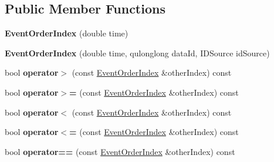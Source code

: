 \subsection*{Public Member Functions}
\begin{DoxyCompactItemize}
\item 
\hypertarget{class_picto_1_1_event_order_index_a6fedef2375e03834e3ae12951a050a47}{{\bfseries Event\-Order\-Index} (double time)}\label{class_picto_1_1_event_order_index_a6fedef2375e03834e3ae12951a050a47}

\item 
\hypertarget{class_picto_1_1_event_order_index_aa416ccc77d4453beff9ee55adcb070e3}{{\bfseries Event\-Order\-Index} (double time, qulonglong data\-Id, I\-D\-Source id\-Source)}\label{class_picto_1_1_event_order_index_aa416ccc77d4453beff9ee55adcb070e3}

\item 
\hypertarget{class_picto_1_1_event_order_index_ade1fd9fcac2a2fee91d082618a99c431}{bool {\bfseries operator$>$} (const \hyperlink{class_picto_1_1_event_order_index}{Event\-Order\-Index} \&other\-Index) const }\label{class_picto_1_1_event_order_index_ade1fd9fcac2a2fee91d082618a99c431}

\item 
\hypertarget{class_picto_1_1_event_order_index_ae47c0c5125a8cb24df609a114200bb18}{bool {\bfseries operator$>$=} (const \hyperlink{class_picto_1_1_event_order_index}{Event\-Order\-Index} \&other\-Index) const }\label{class_picto_1_1_event_order_index_ae47c0c5125a8cb24df609a114200bb18}

\item 
\hypertarget{class_picto_1_1_event_order_index_a7b81c0f78383d57506c701c406458df2}{bool {\bfseries operator$<$} (const \hyperlink{class_picto_1_1_event_order_index}{Event\-Order\-Index} \&other\-Index) const }\label{class_picto_1_1_event_order_index_a7b81c0f78383d57506c701c406458df2}

\item 
\hypertarget{class_picto_1_1_event_order_index_a467b9011c4c2356cccecb186222cc70d}{bool {\bfseries operator$<$=} (const \hyperlink{class_picto_1_1_event_order_index}{Event\-Order\-Index} \&other\-Index) const }\label{class_picto_1_1_event_order_index_a467b9011c4c2356cccecb186222cc70d}

\item 
\hypertarget{class_picto_1_1_event_order_index_a661476e25105f4ab02d55d7aebf232e4}{bool {\bfseries operator==} (const \hyperlink{class_picto_1_1_event_order_index}{Event\-Order\-Index} \&other\-Index) const }\label{class_picto_1_1_event_order_index_a661476e25105f4ab02d55d7aebf232e4}


\end{DoxyCompactItemize}
